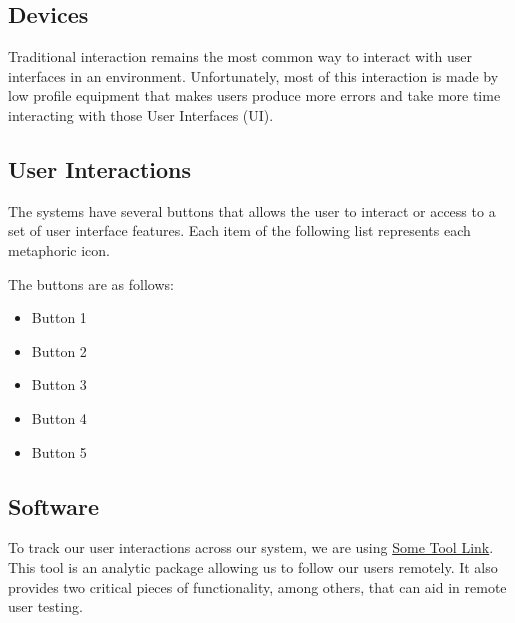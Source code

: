 \subsection{Devices}

Traditional interaction remains the most common way to interact with user interfaces in an environment. Unfortunately, most of this interaction is made by low profile equipment that makes users produce more errors and take more time interacting with those User Interfaces (UI).


\subsection{User Interactions}

The systems have several buttons that allows the user to interact or access to a set of user interface features. Each item of the following list represents each metaphoric icon.

The buttons are as follows:

\hfill

\begin{itemize}
\item Button 1
\item Button 2
\item Button 3
\item Button 4
\item Button 5
\end{itemize}

\hfill

\subsection{Software}

To track our user interactions across our system, we are using \hyperlink{}{Some Tool Link}. This tool is an analytic package allowing us to follow our users remotely. It also provides two critical pieces of functionality, among others, that can aid in remote user testing.